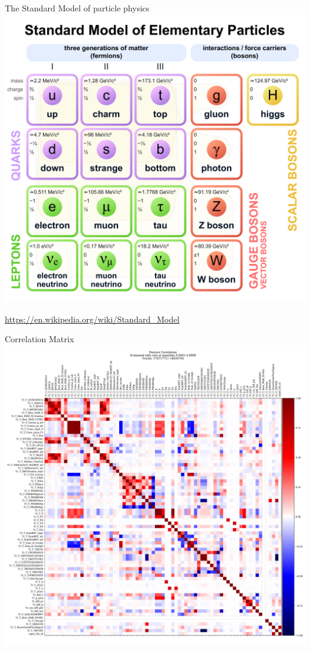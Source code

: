 \documentclass[aspectratio=1610, 10pt]{beamer}
\begin{document}
\begin{frame}{The Standard Model of particle physics}
  \centering
  \includegraphics[height=0.9\textheight]{images/standard_model.pdf}

  \tiny \url{https://en.wikipedia.org/wiki/Standard_Model}
\end{frame}

\begin{frame}{Correlation Matrix}
  \centering
  \includegraphics[height=0.9\textheight]{images/backup/correlation_matrix.pdf}
\end{frame}
\end{document}
